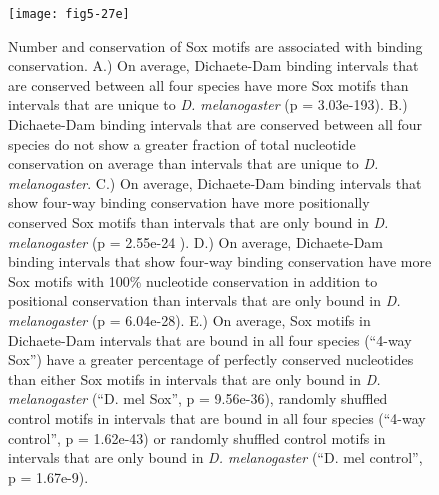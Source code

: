 \begin{figure}[H]
\centering
\texttt{[image: fig5-27e]}
\caption{Number and conservation of Sox motifs are associated with binding conservation. A.) On average, Dichaete-Dam binding intervals that are conserved between all four species have more Sox motifs than intervals that are unique to \emph{D. melanogaster} (p = 3.03e-193). B.) Dichaete-Dam binding intervals that are conserved between all four species do not show a greater fraction of total nucleotide conservation on average than intervals that are unique to \emph{D. melanogaster}. C.) On average, Dichaete-Dam binding intervals that show four-way binding conservation have more positionally conserved Sox motifs than intervals that are only bound in \emph{D. melanogaster} (p = 2.55e-24 ). D.) On average, Dichaete-Dam binding intervals that show four-way binding conservation have more Sox motifs with 100\% nucleotide conservation in addition to positional conservation than intervals that are only bound in \emph{D. melanogaster} (p = 6.04e-28). E.) On average, Sox motifs in Dichaete-Dam intervals that are bound in all four species (“4-way Sox”) have a greater percentage of perfectly conserved nucleotides than either Sox motifs in intervals that are only bound in \emph{D. melanogaster} (“D. mel Sox”, p = 9.56e-36), randomly shuffled control motifs in intervals that are bound in all four species (“4-way control”, p = 1.62e-43) or randomly shuffled control motifs in intervals that are only bound in \emph{D. melanogaster} (“D. mel control”, p = 1.67e-9).}
\label{Figure 5.27}
\end{figure}

